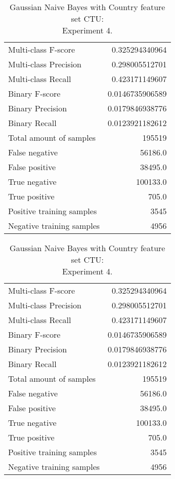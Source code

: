 \begin{table}[H]
\begin{minipage}{0.5\textwidth}
\caption{Gaussian Naive Bayes with Country feature set CTU: \\Experiment 3.}
\centering
\begin{tabular}{l r}
\toprule
Multi-class F-score & 0.325294340964 \\
Multi-class Precision & 0.298005512701 \\
Multi-class Recall & 0.423171149607 \\
\midrule
Binary F-score & 0.0146735906589 \\
Binary Precision & 0.0179846938776 \\
Binary Recall & 0.0123921182612 \\
\midrule
Total amount of samples & 195519 \\
False negative & 56186.0 \\
False positive & 38495.0 \\
True negative & 100133.0 \\
True positive & 705.0 \\
\midrule
Positive training samples & 3545 \\
Negative training samples & 4956 \\
\bottomrule
\end{tabular}
\end{minipage}
\hfillx
\begin{minipage}{0.5\textwidth}
\caption{Gaussian Naive Bayes with Country feature set CTU: \\Experiment 4.}
\centering
\begin{tabular}{l r}
\toprule
Multi-class F-score & 0.325294340964 \\
Multi-class Precision & 0.298005512701 \\
Multi-class Recall & 0.423171149607 \\
\midrule
Binary F-score & 0.0146735906589 \\
Binary Precision & 0.0179846938776 \\
Binary Recall & 0.0123921182612 \\
\midrule
Total amount of samples & 195519 \\
False negative & 56186.0 \\
False positive & 38495.0 \\
True negative & 100133.0 \\
True positive & 705.0 \\
\midrule
Positive training samples & 3545 \\
Negative training samples & 4956 \\
\bottomrule
\end{tabular}
\end{minipage}
\end{table}
